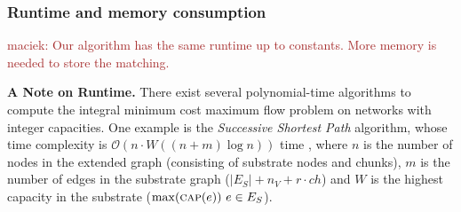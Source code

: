 \documentclass[9pt,twocolumn]{scrartcl}
\newcommand{\Capacity}{\ensuremath{\textsc{cap}}}
\newcommand{\maciek}[1]{\textcolor{brown}{maciek: #1}}
\newcommand{\RedundancyFactor}{\ensuremath{r}}
\newcommand{\SubstrateEdges}{\ensuremath{E_S}}
\newcommand{\SubstrateEdge}{\ensuremath{e}}
\newcommand{\Vms}{\ensuremath{n_V}}
\newcommand{\ChunkTypes}{\ensuremath{ch}}
\begin{document}
\subsubsection{Runtime and memory consumption}

\maciek{Our algorithm has the same runtime up to constants. More memory is needed to store the matching.}

\textbf{A Note on Runtime.} There exist several polynomial-time algorithms to compute
the integral minimum cost maximum flow problem on networks with integer capacities.
One example is the \emph{Successive Shortest Path} algorithm,
whose time complexity is $\mathcal{O}(n \cdot W((n+m)\log n)
)$ time \cite{successive_shortest_path_complexity}, where $n$ is the number of
nodes in the extended graph (consisting of substrate nodes and chunks),
$m$ is the number of edges in the substrate graph ($|\SubstrateEdges| + \Vms + \RedundancyFactor
\cdot \ChunkTypes$) and $W$ is the highest capacity in the substrate
($\max(\Capacity(\SubstrateEdge))~\SubstrateEdge\in\SubstrateEdges$).
\end{document}
